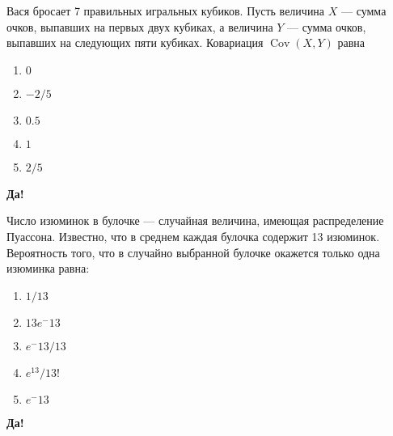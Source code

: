 \documentclass[t]{beamer}
\DeclareMathOperator{\Cov}{Cov}
\begin{document}
 \begin{frame} \label{11-Yes} 
\begin{block}{11} 

Вася бросает 7 правильных игральных кубиков. Пусть величина  $X$ — сумма очков, выпавших на первых двух кубиках, а величина  $Y$ — сумма очков, выпавших на следующих пяти кубиках. Ковариация $\Cov(X,Y)$ равна
 


 \end{block} 
\begin{enumerate} 
\item[] \hyperlink{11-Yes}{\beamergotobutton{} $0$}
\item[] \hyperlink{11-No}{\beamergotobutton{} $-2/5$
}
\item[] \hyperlink{11-No}{\beamergotobutton{} $0.5$}
\item[] \hyperlink{11-No}{\beamergotobutton{} $1$}
\item[] \hyperlink{11-No}{\beamergotobutton{} $2/5$}
\end{enumerate} 

 \textbf{Да!} 
 \hyperlink{12}{}\end{frame} 


 \begin{frame} \label{12-Yes} 
\begin{block}{12} 

Число изюминок в булочке — случайная величина, имеющая распределение Пуассона. Известно, что в среднем каждая булочка содержит 13 изюминок. Вероятность того, что в случайно выбранной булочке окажется только одна изюминка равна:
 


 \end{block} 
\begin{enumerate} 
\item[] \hyperlink{12-No}{\beamergotobutton{} $1/13$}
\item[] \hyperlink{12-Yes}{\beamergotobutton{} $13e^-13$}
\item[] \hyperlink{12-No}{\beamergotobutton{} $e^-13/13$}
\item[] \hyperlink{12-No}{\beamergotobutton{} $e^13/13!$
}
\item[] \hyperlink{12-No}{\beamergotobutton{} $e^-13$}
\end{enumerate} 

 \textbf{Да!} 
 \hyperlink{13}{}\end{frame} 
\end{document}
